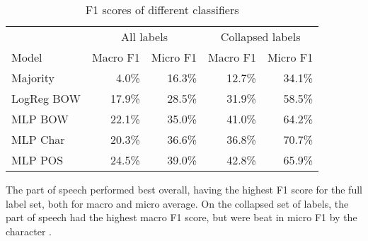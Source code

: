 \begin{table}
  \centering
  \begin{tabular}{|l|rr|rr|}
    \toprule
      & \multicolumn{2}{c|}{All labels} & \multicolumn{2}{c|}{Collapsed labels} \\
    Model      & Macro F1 & Micro F1 & Macro F1 & Micro F1 \\
    \midrule
    Majority   &    4.0\% &   16.3\% &   12.7\% &   34.1\% \\
    LogReg BOW &   17.9\% &   28.5\% &   31.9\% &   58.5\% \\
    MLP BOW    &   22.1\% &   35.0\% &   41.0\% &   64.2\% \\
    MLP Char   &   20.3\% &   36.6\% &   36.8\% &   70.7\% \\
    MLP POS    &   24.5\% &   39.0\% &   42.8\% &   65.9\% \\
    \bottomrule
  \end{tabular}
  \caption{F1 scores of different classifiers}
  \label{baseline-accuracies}
\end{table}

The part of speech \ngrams performed best overall, having the highest F1 score
for the full label set, both for macro and micro average. On the collapsed set
of labels, the part of speech \ngrams had the highest macro F1 score, but were
beat in micro F1 by the character \ngrams.
